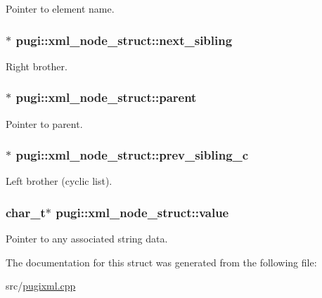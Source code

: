 Pointer to element name. \hypertarget{structpugi_1_1xml__node__struct_acf0867e3a77871e37132046d97398a6d}{
\subsubsection[{next\_\-sibling}]{$\ast$ {\bf pugi::xml\_\-node\_\-struct::next\_\-sibling}}}
\label{structpugi_1_1xml__node__struct_acf0867e3a77871e37132046d97398a6d}


Right brother. \hypertarget{structpugi_1_1xml__node__struct_af692c222bcc5a9f61108cb3ae0b7b5ea}{
\subsubsection[{parent}]{$\ast$ {\bf pugi::xml\_\-node\_\-struct::parent}}}
\label{structpugi_1_1xml__node__struct_af692c222bcc5a9f61108cb3ae0b7b5ea}


Pointer to parent. \hypertarget{structpugi_1_1xml__node__struct_a74e62128c88c422c0ed969633bbb2d4e}{
\subsubsection[{prev\_\-sibling\_\-c}]{$\ast$ {\bf pugi::xml\_\-node\_\-struct::prev\_\-sibling\_\-c}}}
\label{structpugi_1_1xml__node__struct_a74e62128c88c422c0ed969633bbb2d4e}


Left brother (cyclic list). \hypertarget{structpugi_1_1xml__node__struct_a191e708864fccda17bb66157afdadd2d}{
\subsubsection[{value}]{\setlength{\rightskip}{0pt plus 5cm}char\_\-t$\ast$ {\bf pugi::xml\_\-node\_\-struct::value}}}
\label{structpugi_1_1xml__node__struct_a191e708864fccda17bb66157afdadd2d}


Pointer to any associated string data. 

The documentation for this struct was generated from the following file:\begin{DoxyCompactItemize}
\item 
src/\hyperlink{pugixml_8cpp}{pugixml.cpp}\end{DoxyCompactItemize}
